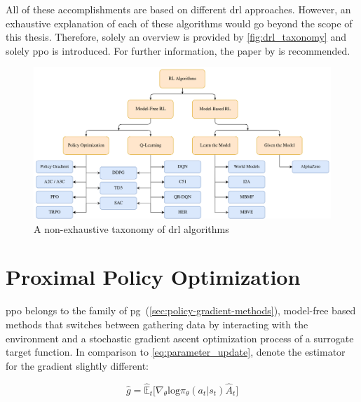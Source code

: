 \documentclass[draft,final]{vutinfth} %
\newcommand{\pautoref}[1]{(\autoref{#1})}
\begin{document}
    All of these accomplishments are based on different \gls{drl} approaches.
    However, an exhaustive explanation of each of these algorithms would go beyond the scope of this thesis.
    Therefore, solely an overview is provided by \autoref{fig:drl_taxonomy} and solely \gls{ppo} is introduced.
    For further information, the paper by \citeauthor{francois-lavet_introduction_2018} is recommended.

    \begin{figure}[h]
        \centering
        \includegraphics[width=\textwidth]{figures/drl_taxonomy.png}
        \caption[A non-exhaustive taxonomy of \acrlong{drl} algorithms]{A non-exhaustive taxonomy of \gls{drl} algorithms\protect\footnotemark}
        \label{fig:drl_taxonomy}
    \end{figure}



    \section{Proximal Policy Optimization}\label{sec:proximal-policy-optimization}
    \gls{ppo} belongs to the family of \gls{pg}~\pautoref{sec:policy-gradient-methods}, model-free based methods that switches between gathering data by interacting with the environment and a stochastic gradient ascent optimization process of a surrogate target function.
    In comparison to \autoref{eq:parameter_update}, \citet{schulman_proximal_2017} denote the estimator for the gradient slightly different:

    \begin{equation}
        \hat{g}=\hat{\mathbb{E}}_t \bigg [\nabla_\theta \text{log}\pi_\theta(a_t|s_t)\hat{A}_t\bigg]\label{eq:policy_gradient_method_maximization}
    \end{equation}
\end{document}
